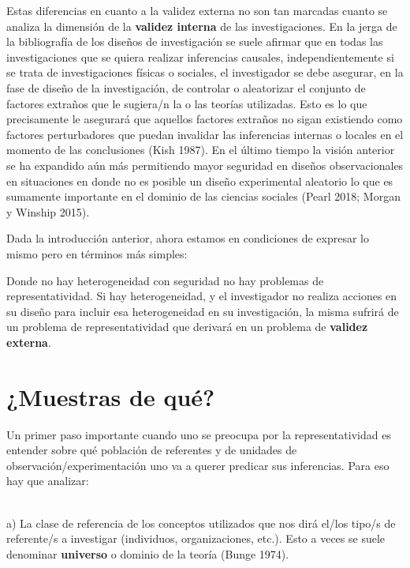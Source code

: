 \documentclass[
  spanish,
  a4paper,
]{scrreprt}
\begin{document}
Estas diferencias en cuanto a la validez externa no son tan marcadas
cuanto se analiza la dimensión de la \textbf{validez interna} de las
investigaciones. En la jerga de la bibliografía de los diseños de
investigación se suele afirmar que en todas las investigaciones que se
quiera realizar inferencias causales, independientemente si se trata de
investigaciones físicas o sociales, el investigador se debe asegurar, en
la fase de diseño de la investigación, de controlar o aleatorizar el
conjunto de factores extraños que le sugiera/n la o las teorías
utilizadas. Esto es lo que precisamente le asegurará que aquellos
factores extraños no sigan existiendo como factores perturbadores que
puedan invalidar las inferencias internas o locales en el momento de las
conclusiones (Kish 1987). En el último tiempo la visión anterior se ha
expandido aún más permitiendo mayor seguridad en diseños observacionales
en situaciones en donde no es posible un diseño experimental aleatorio
lo que es sumamente importante en el dominio de las ciencias sociales
(Pearl 2018; Morgan y Winship 2015).

Dada la introducción anterior, ahora estamos en condiciones de expresar
lo mismo pero en términos más simples:

\begin{tcolorbox}[enhanced jigsaw, leftrule=.75mm, title=\textcolor{quarto-callout-note-color}{\faInfo}\hspace{0.5em}{Nota}, colframe=quarto-callout-note-color-frame, coltitle=black, breakable, opacityback=0, bottomtitle=1mm, opacitybacktitle=0.6, rightrule=.15mm, titlerule=0mm, toprule=.15mm, colbacktitle=quarto-callout-note-color!10!white, left=2mm, toptitle=1mm, bottomrule=.15mm, arc=.35mm, colback=white]

Donde no hay heterogeneidad con seguridad no hay problemas de
representatividad. Si hay heterogeneidad, y el investigador no realiza
acciones en su diseño para incluir esa heterogeneidad en su
investigación, la misma sufrirá de un problema de representatividad que
derivará en un problema de \textbf{validez externa}.

\end{tcolorbox}

\section{¿Muestras de qué?}\label{muestras-de-quuxe9}

\hfill\break
Un primer paso importante cuando uno se preocupa por la
representatividad es entender sobre qué población de referentes y de
unidades de observación/experimentación uno va a querer predicar sus
inferencias. Para eso hay que analizar:~\\
\strut \\
a) La clase de referencia de los conceptos utilizados que nos dirá
el/los tipo/s de referente/s a investigar (individuos, organizaciones,
etc.). Esto a veces se suele denominar \textbf{universo} o dominio de la
teoría (Bunge 1974).
\end{document}
